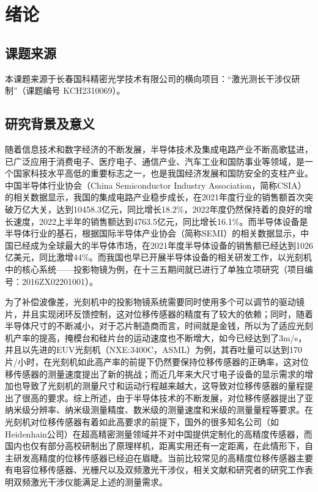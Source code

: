 \chapter{绪论}

\section{课题来源}
本课题来源于长春国科精密光学技术有限公司的横向项目：“激光测长干涉仪研制”（课题编号 KCH2310069）。

\section{研究背景及意义}
随着信息技术和数字经济的不断发展，半导体技术及集成电路产业不断高歌猛进，已广泛应用于消费电子、医疗电子、通信产业、汽车工业和国防事业等领域，是一个国家科技水平高低的重要标志之一，也是我国经济发展和国防安全的支柱产业。中国半导体行业协会（China Semiconductor Industry Association，简称CSIA）的相关数据显示，我国的集成电路产业稳步成长，在2021年度行业的销售额首次突破万亿大关，达到10458.3亿元，同比增长18.2$\%$，2022年度仍然保持着的良好的增长速度，2022上半年的销售额达到4763.5亿元，同比增长16.1$\%$\cite{csia1}。而半导体设备是半导体行业的基石，根据国际半导体产业协会（简称SEMI）的相关数据显示，中国已经成为全球最大的半导体市场，在2021年度半导体设备的销售额已经达到1026亿美元，同比激增44$\%$\cite{中国再次成为全球最大半导体设备市场}。而我国也早已开展半导体设备的相关研发工作，以光刻机中的核心系统——投影物镜为例，在十三五期间就已进行了单独立项研究（项目编号：2016ZX02201001）。

为了补偿波像差，光刻机中的投影物镜系统需要同时使用多个可以调节的驱动镜片，并且实现闭环反馈控制，这对位移传感器的精度有了较大的依赖；同时，随着半导体尺寸的不断减小，对于芯片制造商而言，时间就是金钱，所以为了适应光刻机产率的提高，掩模台和硅片台的运动速度也不断增大，如今已经达到了3m/s，并且以先进的EUV光刻机（NXE:3400C，ASML）为例，其吞吐量可以达到170片/小时，在光刻机如此高产率的前提下仍然要保持位移传感器的正确率，这对位移传感器的测量速度提出了新的挑战；而近几年来大尺寸电子设备的显示需求的增加也导致了光刻机的测量尺寸和运动行程越来越大，这导致对位移传感器的量程提出了很高的要求。综上所述，由于半导体技术的不断发展，对位移传感器提出了亚纳米级分辨率、纳米级测量精度、数米级的测量速度和米级的测量量程等要求。在光刻机对位移传感器有着如此高要求的前提下，国外的很多知名公司（如Heidenhain公司）在超高精密测量领域并不对中国提供定制化的高精度传感器，而国内也仅有部分高校研制出了原理样机，距离实用还有一定距离，在此情形下，自主研发高精度的位移传感器已经迫在眉睫。当前比较常见的高精度位移传感器主要有电容位移传感器、光栅尺以及双频激光干涉仪，相关文献和研究者的研究工作表明双频激光干涉仪能满足上述的测量需求\cite{2022reso1ution,张志平2022激光外差干涉技术在光刻机中的应用,于海娇2022双频激光干涉仪的应用研究综述,2007Studyon,2021Microchip,202019picometer}。

